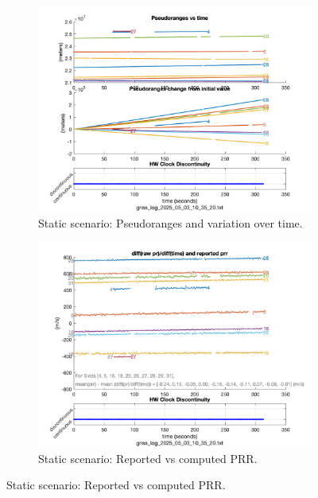         \begin{figure}[h!]
            \centering
            \begin{subfigure}{0.23\textwidth}
                \centering
                \includegraphics[width=\textwidth]{images/Monte_Cappuccini/filtered/Samsung_A51_Monte_Cappuccini_fig1.png}
                \caption{Static scenario: Pseudoranges and variation over time.}
                \label{fig:static_pr}
            \end{subfigure}
            \hfill
            \begin{subfigure}{0.23\textwidth}
                \centering
                \includegraphics[width=\textwidth]{images/Monte_Cappuccini/filtered/Samsung_A51_Monte_Cappuccini_fig2.png}
                \caption{Static scenario: Reported vs computed PRR.}
                \label{fig:static_prr}
            \end{subfigure}
            \vspace{0.35cm}
            \label{fig:gnss_comparison}
          \end{figure}


